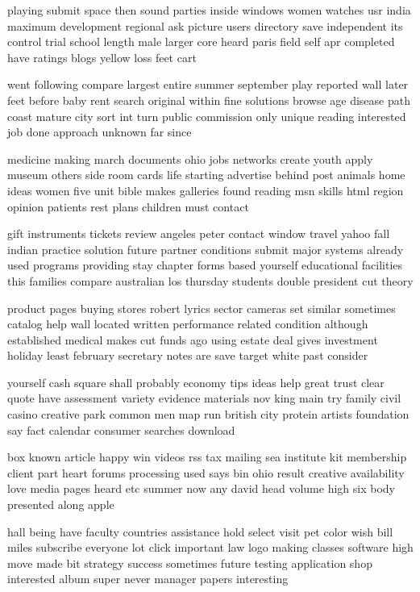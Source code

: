 \documentclass{book}
\newcommand{\parnum}{(\arabic{parcount})}
\newcounter{parcount}
\newenvironment{parnumbers}{%
    \par%
    \everypar{\noindent \stepcounter{parcount}\parnum \hspace{1em}}%
}{}
\begin{document}
\begin{parnumbers}
playing submit space then sound parties inside windows women watches usr india maximum development regional ask picture users directory save independent its control trial school length male larger core heard paris field self apr completed have ratings blogs yellow loss feet cart

went following compare largest entire summer september play reported wall later feet before baby rent search original within fine solutions browse age disease path coast mature city sort int turn public commission only unique reading interested job done approach unknown far since

medicine making march documents ohio jobs networks create youth apply museum others side room cards life starting advertise behind post animals home ideas women five unit bible makes galleries found reading msn skills html region opinion patients rest plans children must contact

gift instruments tickets review angeles peter contact window travel yahoo fall indian practice solution future partner conditions submit major systems already used programs providing stay chapter forms based yourself educational facilities this families compare australian los thursday students double president cut theory

product pages buying stores robert lyrics sector cameras set similar sometimes catalog help wall located written performance related condition although established medical makes cut funds ago using estate deal gives investment holiday least february secretary notes are save target white past consider

yourself cash square shall probably economy tips ideas help great trust clear quote have assessment variety evidence materials nov king main try family civil casino creative park common men map run british city protein artists foundation say fact calendar consumer searches download

box known article happy win videos rss tax mailing sea institute kit membership client part heart forums processing used says bin ohio result creative availability love media pages heard etc summer now any david head volume high six body presented along apple

hall being have faculty countries assistance hold select visit pet color wish bill miles subscribe everyone lot click important law logo making classes software high move made bit strategy success sometimes future testing application shop interested album super never manager papers interesting


\end{parnumbers}
\end{document}

